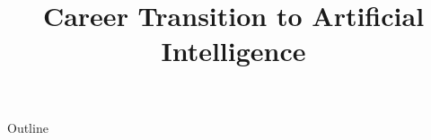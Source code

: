 \documentclass[xcolor=dvipsnames,compress,t,pdf,9pt]{beamer}
\title[\insertframenumber /\inserttotalframenumber]{Career Transition to Artificial Intelligence}
\begin{document}
	\begin{frame}
	\titlepage
	\end{frame}
	
	\begin{frame}{Outline}
	    \tableofcontents
	\end{frame}

	
	
	
	
\end{document}
